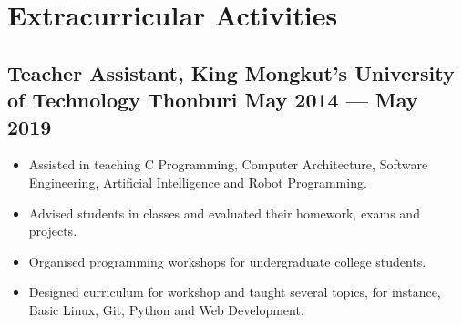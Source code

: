 \documentclass{article}
\newenvironment{zitemize}{
\begin{itemize}\itemsep0pt \parskip0pt \parsep1pt}
{\end{itemize}\vspace{-0.5cm}}
\newcommand{\hskills}[1]{
\textbf{\bfseries #1} }
\begin{document}

    \section{Extracurricular Activities} %
        \subsection*{Teacher Assistant, {\normalsize\normalfont King Mongkut's University of Technology Thonburi} \hfill May 2014 --- May 2019} 
            \begin{zitemize}
                \item Assisted in teaching C Programming, Computer Architecture, Software Engineering, Artificial Intelligence and Robot Programming.
                \item Advised students in classes and evaluated their homework, exams and projects.
                \item Organised programming workshops for undergraduate college students.
                \item Designed curriculum for workshop and taught several topics, for instance, Basic Linux, Git, Python and Web Development.
            \end{zitemize}

\end{document}
